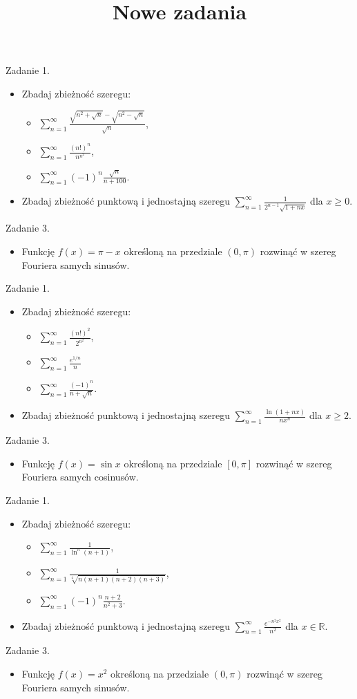 \documentclass{article}
\title{Nowe zadania}
\begin{document}

\noindent Zadanie 1. 
\begin{itemize}
\item Zbadaj zbieżność szeregu:
\begin{itemize}
\item $\sum_{n=1}^{\infty}\frac{\sqrt{n^2 + \sqrt{n}} - \sqrt{n^2-\sqrt{n}}}{\sqrt{n}}$,
\item $\sum_{n=1}^{\infty}\frac{(n!)^n}{n^{n^2}}$,
\item $\sum_{n=1}^{\infty}(-1)^n\frac{\sqrt{n}}{n+100}.$
\end{itemize}
\item Zbadaj zbieżność punktową i jednostajną szeregu $\sum_{n=1}^{\infty}\frac{1}{2^{n-1}\sqrt{1+nx}}$ dla $x \geq 0$.
\end{itemize}
Zadanie 3.
\begin{itemize}
\item Funkcję $f(x)  = \pi -x $ określoną na przedziale $(0, \pi)$ rozwinąć w szereg Fouriera samych sinusów.
\end{itemize}

\noindent Zadanie 1. 
\begin{itemize}
\item Zbadaj zbieżność szeregu:
\begin{itemize}
\item $\sum_{n=1}^{\infty}\frac{(n!)^2}{2^{n^2}}$,
\item $\sum_{n=1}^{\infty}\frac{e^{1/n}}{n}$
\item $\sum_{n=1}^{\infty}\frac{(-1)^n}{n+\sqrt{n}}.$
\end{itemize}
\item Zbadaj zbieżność punktową i jednostajną szeregu $\sum_{n=1}^{\infty}\frac{\ln (1+nx)}{nx^n}$ dla $x \geq 2$.
\end{itemize}
Zadanie 3.
\begin{itemize}
\item Funkcję $f(x)  = \sin x $ określoną na przedziale $[0, \pi]$ rozwinąć w szereg Fouriera samych cosinusów.
\end{itemize}


\noindent Zadanie 1. 
\begin{itemize}
\item Zbadaj zbieżność szeregu:
\begin{itemize}
\item $\sum_{n=1}^{\infty}\frac{1}{\ln^n(n+1)}$,
\item $\sum_{n=1}^{\infty}\frac{1}{\sqrt[4]{n(n+1)(n+2)(n+3)}}$,
\item $\sum_{n=1}^{\infty}(-1)^n\frac{n+2}{n^2+3}.$
\end{itemize}
\item Zbadaj zbieżność punktową i jednostajną szeregu $\sum_{n=1}^{\infty}\frac{e^{-n^2x^2}}{n^2}$ dla $x \in \mathbb{R}$.
\end{itemize}
Zadanie 3.
\begin{itemize}
\item Funkcję $f(x)  = x^2 $ określoną na przedziale $(0, \pi)$ rozwinąć w szereg Fouriera samych sinusów.
\end{itemize}
\end{document}
